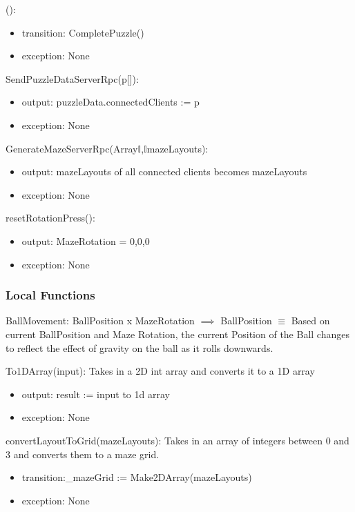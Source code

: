 \documentclass[12pt, titlepage]{article}
\begin{document}
():
\begin{itemize}
\item transition: CompletePuzzle()
\item exception: None
\end{itemize}

\noindent SendPuzzleDataServerRpc(p[]):
\begin{itemize}
\item output: puzzleData.connectedClients := p
\item exception: None
\end{itemize}

\noindent GenerateMazeServerRpc(Array\textlangle$\mathds{I}$,$\mathds{I}$\textrangle  mazeLayouts):
\begin{itemize}
\item output: mazeLayouts of all connected clients becomes mazeLayouts
\item exception: None
\end{itemize}

\noindent resetRotationPress():
\begin{itemize}
\item output: MazeRotation = 0,0,0
\item exception: None
\end{itemize}


\subsubsection{Local Functions}

BallMovement: BallPosition x MazeRotation $\implies$ BallPosition $\equiv$ Based on current BallPosition and Maze Rotation, the current Position of the Ball changes to reflect the effect of gravity on the ball as it rolls downwards. 

\noindent To1DArray(input): Takes in a 2D int array and converts it to a 1D array
\begin{itemize}
    \item output: result := input to 1d array
    \item exception: None
\end{itemize}

\noindent convertLayoutToGrid(mazeLayouts): Takes in an array of integers between 0 and 3 and converts them to a maze grid.
\begin{itemize}
    \item transition:\_mazeGrid := Make2DArray(mazeLayouts)
    \item exception: None
\end{itemize}
\end{document}
